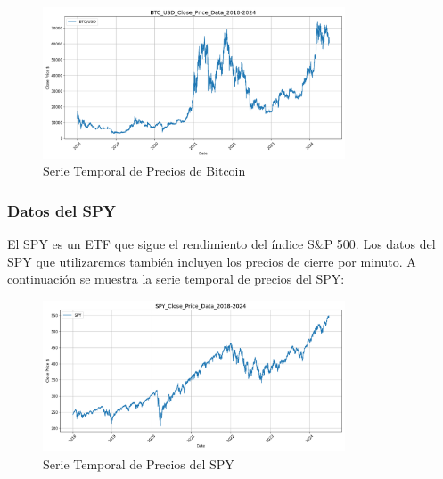 \documentclass[a4paper,12pt, twoside]{report}
\begin{document}
\begin{figure}[H]
    \centering
    \includegraphics[width=0.8\textwidth]{./figures/BTC_USD_Close_Price_Data_2018-2024.png}
    \caption{Serie Temporal de Precios de Bitcoin}
    \label{fig:bitcoin-prices}
\end{figure}

\subsubsection{Datos del SPY}

El SPY es un ETF que sigue el rendimiento del índice S\&P 500. Los datos del SPY que utilizaremos también incluyen los precios de cierre 
por minuto. A continuación se muestra la serie temporal de precios del SPY:

\begin{figure}[H]
    \centering
    \includegraphics[width=0.8\textwidth]{figures/SPY_Close_Price_Data_2018-2024.png}
    \caption{Serie Temporal de Precios del SPY}
    \label{fig:spy-prices}
\end{figure}


\end{document}
